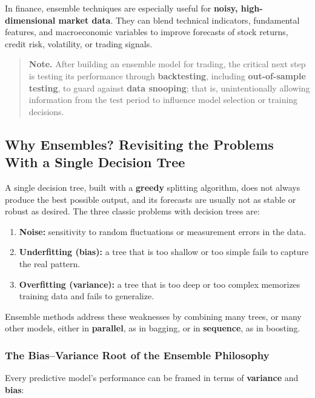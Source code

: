 \documentclass[12pt,openany]{book}
\begin{document}
In finance, ensemble techniques are especially useful for \textbf{noisy, high-dimensional market data}. They can blend technical indicators, fundamental features, and macroeconomic variables to improve forecasts of stock returns, credit risk, volatility, or trading signals.

\begin{quote}
\textbf{Note.} After building an ensemble model for trading, the critical next step is testing its performance through \textbf{backtesting}, including \textbf{out-of-sample testing}, to guard against \textbf{data snooping}; that is, unintentionally allowing information from the test period to influence model selection or training decisions.
\end{quote}

\subsection{Why Ensembles? Revisiting the Problems With a Single Decision Tree}

A single decision tree, built with a \textbf{greedy} splitting algorithm, does not always produce the best possible output, and its forecasts are usually not as stable or robust as desired. The three classic problems with decision trees are:

\begin{enumerate}[leftmargin=*]
    \item \textbf{Noise:} sensitivity to random fluctuations or measurement errors in the data.
    \item \textbf{Underfitting (bias):} a tree that is too shallow or too simple fails to capture the real pattern.
    \item \textbf{Overfitting (variance):} a tree that is too deep or too complex memorizes training data and fails to generalize.
\end{enumerate}

Ensemble methods address these weaknesses by combining many trees, or many other models, either in \textbf{parallel}, as in bagging, or in \textbf{sequence}, as in boosting.

\subsubsection{The Bias--Variance Root of the Ensemble Philosophy}

Every predictive model's performance can be framed in terms of \textbf{variance} and \textbf{bias}:
\end{document}
